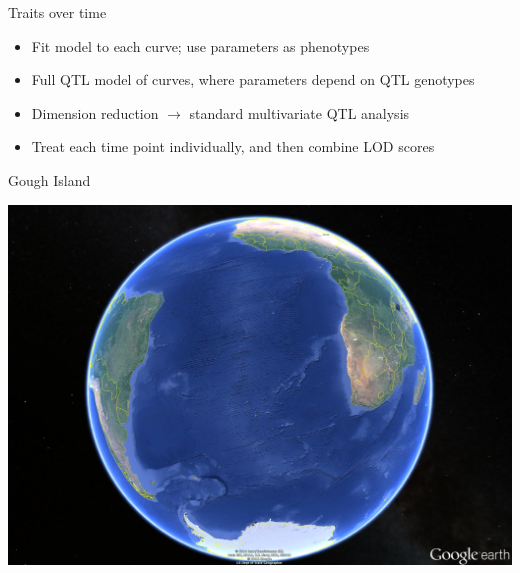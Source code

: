 \documentclass[12pt]{article}
\newcommand{\headsize}{\fontsize{35}{35} \selectfont}
\newcommand{\smallersize}{\fontsize{20}{25} \selectfont}
\begin{document}
\newpage

\headsize \color{myyellow}
\hfill \begin{minipage}{5.75in}
\centering
Traits over time
\end{minipage}

\vspace{25mm}

\color{mywhite} \smallersize

\hspace{0.5in} \begin{minipage}{9.5in}

  \begin{itemize}
    \itemsep18pt

  \item Fit model to each curve; use parameters as phenotypes
  \item Full QTL model of curves, where parameters depend on QTL genotypes
  \item Dimension reduction $\rightarrow$ standard multivariate QTL
    analysis
  \item Treat each time point individually, and then combine LOD
    scores
  \end{itemize}

\end{minipage}


\newpage

\headsize \color{myyellow}
\hfill \begin{minipage}{5.75in}
\centering
Gough Island
\end{minipage}

\vspace{25mm}

\centerline{\includegraphics[height=0.8\textheight]{Figs/Gough_google_earth.png}}
\end{document}
